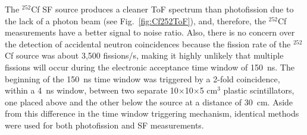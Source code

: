The $^{252}$Cf SF source produces a cleaner ToF spectrum than photofission due to the lack of a photon beam (see Fig.~\ref{fig:Cf252ToF}), and, therefore, the $^{252}$Cf measurements have a better signal to noise ratio.
Also, there is no concern over the detection of accidental neutron coincidences because the fission rate of the $^{252}$Cf source was about 3,500 fissions/s, making it highly unlikely that multiple fissions will occur during the electronic acceptance time window of 150~ns.
The beginning of the 150~ns time window was triggered by a 2-fold coincidence, within a 4~ns window, between two separate 10$\times$10$\times$5 cm$^3$ plastic scintillators, one placed above and the other below the source at a distance of 30~cm.
Aside from this difference in the time window triggering mechanism, identical methods were used for both photofission and SF measurements.